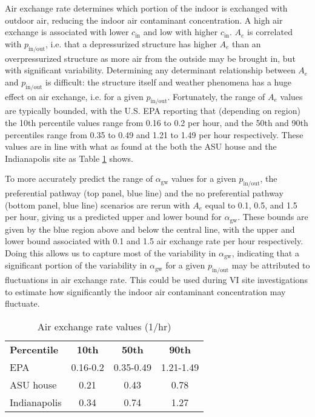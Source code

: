 \documentclass[journal=esthag,manuscript=article]{achemso}
\begin{document}
Air exchange rate determines which portion of the indoor is exchanged with outdoor air, reducing the indoor air contaminant concentration.
A high air exchange is associated with lower $c_\mathrm{in}$ and low with higher $c_\mathrm{in}$.
$A_e$ is correlated with $p_\mathrm{in/out}$, i.e. that a depressurized structure has higher $A_e$ than an overpressurized structure as more air from the outside may be brought in, but with significant variability.
Determining any determinant relationship between $A_e$ and $p_\mathrm{in/out}$ is difficult: the structure itself and weather phenomena has a huge effect on air exchange, i.e. for a given $p_\mathrm{in/out}$.
Fortunately, the range of $A_e$ values are typically bounded, with the U.S. EPA reporting that (depending on region) the 10th percentile values range from 0.16 to 0.2 per hour, and the 50th and 90th percentiles range from 0.35 to 0.49 and 1.21 to 1.49 per hour respectively\cite{u.s._epa_exposure_2011,m._d._koontz_estimation_1995}.
These values are in line with what as found at the both the ASU house and the Indianapolis site as Table \ref{tbl:air_exchange_rate} shows.

To more accurately predict the range of $\alpha_\mathrm{gw}$ values for a given $p_\mathrm{in/out}$, the preferential pathway (top panel, blue line) and the no preferential pathway (bottom panel, blue line) scenarios are rerun with $A_e$ equal to 0.1, 0.5, and 1.5 per hour, giving us a predicted upper and lower bound for $\alpha_\mathrm{gw}$.
These bounds are given by the blue region above and below the central line, with the upper and lower bound associated with 0.1 and 1.5 air exchange rate per hour respectively.
Doing this allows us to capture most of the variability in $\alpha_\mathrm{gw}$, indicating that a significant portion of the variability in $\alpha_\mathrm{gw}$ for a given $p_\mathrm{in/out}$ may be attributed to fluctuations in air exchange rate.
This could be used during VI site investigations to estimate how significantly the indoor air contaminant concentration may fluctuate.

\begin{table}[htb!]
 \caption{Air exchange rate values (1/hr)}\label{tbl:air_exchange_rate}
 \begin{tabular}{l c c c}
  \toprule
  \textbf{Percentile}                                                     & \textbf{10th} & \textbf{50th} & \textbf{90th} \\
  EPA\cite{u.s._epa_exposure_2011,m._d._koontz_estimation_1995}           & 0.16-0.2      & 0.35-0.49     & 1.21-1.49     \\
  ASU house\cite{holton_temporal_2013,guo_identification_2015}            & 0.21          & 0.43          & 0.78          \\
  Indianapolis\cite{u.s._environmental_protection_agency_assessment_2015} & 0.34          & 0.74          & 1.27          \\
  \bottomrule
 \end{tabular}
\end{table}
\end{document}
